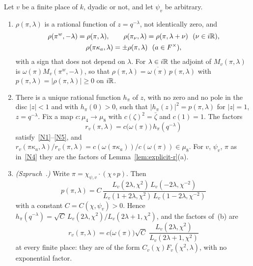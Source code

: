 \begin{propprime}\label{prop:norm-N5}
Let $v$ be a finite place of $k$, dyadic or not, and let $\psi_v$ be
arbitrary.
\begin{enumerate}[label=(\alph*)]
\item $\rho(\pi,\lambda)$ is a rational function of $z=q^{-\lambda}$, not
  identically zero, and
  \begin{gather*}
  \rho(\pi^w,-\lambda)=\rho(\pi,\lambda),\qquad
  \rho(\pi_\nu,\lambda)=\rho(\pi,\lambda+\nu)\ \ (\nu\in i\mathbb{R}),\\
  \rho(\pi\kappa_a,\lambda)=\pm\rho(\pi,\lambda)\ \ (a\in F^\times),
  \end{gather*}
  with a sign that does not depend on $\lambda$. For $\lambda\in i\mathbb{R}$ the
  adjoint of $M_v(\pi,\lambda)$ is $\omega(\pi)M_v(\pi^w,-\lambda)$, so
  that $\rho(\pi,\lambda)=\overline{\omega(\pi)}\,p(\pi,\lambda)$ with
  $p(\pi,\lambda)=|\rho(\pi,\lambda)|\ge0$ on $i\mathbb{R}$.
\item There is a unique rational function $h_\pi$ of $z$, with no zero
  and no pole in the disc $|z|<1$ and with $h_\pi(0)>0$, such that
  $|h_\pi(z)|^2=p(\pi,\lambda)$ for $|z|=1$, $z=q^{-\lambda}$. Fix a map
  $c\colon\mu_4\to\mu_8$ with $c(\zeta)^2=\bar\zeta$ and $c(1)=1$. The
  factors
  \[
  r_v(\pi,\lambda)=c\bigl(\omega(\pi)\bigr)\,h_\pi(q^{-\lambda})
  \]
  satisfy~\ref{N1}--\ref{N5}, and $r_v(\pi\kappa_a,\lambda)/r_v(\pi,\lambda)
  =c(\omega(\pi\kappa_a))/c(\omega(\pi))\in\mu_8$. For $v$, $\psi_v$,
  $\pi$ as in~\ref{N4} they are the factors of
  Lemma~\ref{lem:explicit-r}(a).
\item \emph{(Szpruch~\cite{Sz09,Sz16}.)} Write $\pi=\chi_{\psi,v}\cdot
  (\chi\circ p)$. Then
  \[
  p(\pi,\lambda)=C\,\frac{L_v(2\lambda,\chi^2)\,L_v(-2\lambda,\chi^{-2})}
  {L_v(1+2\lambda,\chi^2)\,L_v(1-2\lambda,\chi^{-2})}
  \]
  with a constant $C=C(\chi,\psi_v)>0$. Hence $h_\pi(q^{-\lambda})=
  \sqrt C\,L_v(2\lambda,\chi^2)/L_v(2\lambda+1,\chi^2)$, and the factors
  of~(b) are
  \[
  r_v(\pi,\lambda)=c\bigl(\omega(\pi)\bigr)\sqrt{C}\;\frac{L_v(2\lambda,
  \chi^2)}{L_v(2\lambda+1,\chi^2)}
  \]
  at every finite place: they are of the form $C_v(\chi)F_v(\chi^2,
  \lambda)$, with no exponential factor.
\end{enumerate}
\end{propprime}

